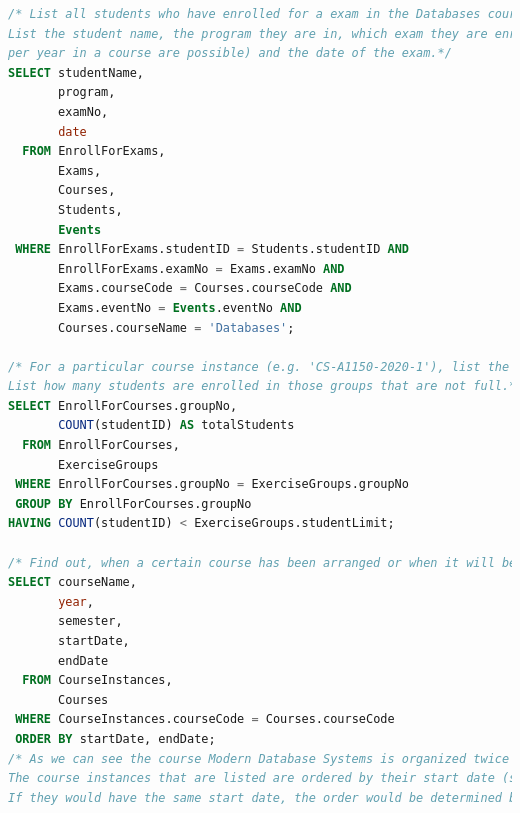 \documentclass{article}
\begin{document}
\begin{lstlisting}[language=SQL]
/* List all students who have enrolled for a exam in the Databases course.
List the student name, the program they are in, which exam they are enrolled in (multiple exams
per year in a course are possible) and the date of the exam.*/
SELECT studentName,
       program,
       examNo,
       date
  FROM EnrollForExams,
       Exams,
       Courses,
       Students,
       Events
 WHERE EnrollForExams.studentID = Students.studentID AND 
       EnrollForExams.examNo = Exams.examNo AND 
       Exams.courseCode = Courses.courseCode AND 
       Exams.eventNo = Events.eventNo AND
       Courses.courseName = 'Databases';

/* For a particular course instance (e.g. 'CS-A1150-2020-1'), list the exercise groups that are not full yet. 
List how many students are enrolled in those groups that are not full.*/
SELECT EnrollForCourses.groupNo,
       COUNT(studentID) AS totalStudents
  FROM EnrollForCourses,
       ExerciseGroups
 WHERE EnrollForCourses.groupNo = ExerciseGroups.groupNo
 GROUP BY EnrollForCourses.groupNo
HAVING COUNT(studentID) < ExerciseGroups.studentLimit;

/* Find out, when a certain course has been arranged or when it will be arranged */
SELECT courseName,
       year,
       semester,
       startDate,
       endDate
  FROM CourseInstances,
       Courses
 WHERE CourseInstances.courseCode = Courses.courseCode
 ORDER BY startDate, endDate;
/* As we can see the course Modern Database Systems is organized twice in 2020.
The course instances that are listed are ordered by their start date (starting the earliest).
If they would have the same start date, the order would be determined by the end date (earliest first). */
\end{lstlisting}
\end{document}
